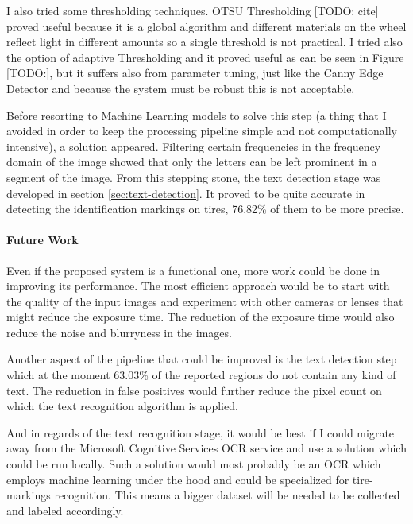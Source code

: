 I also tried some thresholding techniques. OTSU Thresholding [TODO: cite] proved useful because it is a global algorithm and different materials on the wheel reflect light in different amounts so a single threshold is not practical. I tried also the option of adaptive Thresholding and it proved useful as can be seen in Figure [TODO:], but it suffers also from parameter tuning, just like the Canny Edge Detector and because the system must be robust this is not acceptable.

Before resorting to Machine Learning models to solve this step (a thing that I avoided in order to keep the processing pipeline simple and not computationally intensive), a solution appeared. Filtering certain frequencies in the frequency domain of the image showed that only the letters can be left prominent in a segment of the image. From this stepping stone, the text detection stage was developed in section \ref{sec:text-detection}. It proved to be quite accurate in detecting the identification markings on tires, 76.82\% of them to be more precise.

\paragraph{Future Work}\mbox{}\par

Even if the proposed system is a functional one, more work could be done in improving its performance. The most efficient approach would be to start with the quality of the input images and experiment with other cameras or lenses that might reduce the exposure time. The reduction of the exposure time would also reduce the noise and blurryness in the images.

Another aspect of the pipeline that could be improved is the text detection step which at the moment 63.03\% of the reported regions do not contain any kind of text. The reduction in false positives would further reduce the pixel count on which the text recognition algorithm is applied.

And in regards of the text recognition stage, it would be best if I could migrate away from the Microsoft Cognitive Services OCR service and use a solution which could be run locally. Such a solution would most probably be an OCR which employs machine learning under the hood and could be specialized for tire-markings recognition. This means a bigger dataset will be needed to be collected and labeled accordingly.
